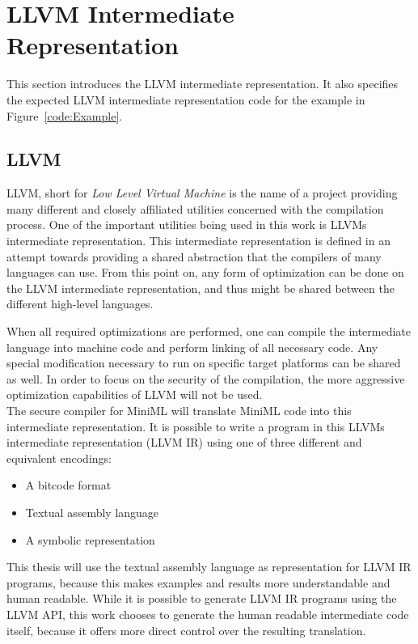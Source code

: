 \documentclass[10pt,a4paper]{report}
\begin{document}

\section{LLVM Intermediate Representation \label{sec:LLVM}}
This section introduces the LLVM intermediate representation. It also specifies the expected LLVM intermediate representation code for the example in Figure~\ref{code:Example}.

\subsection{LLVM}
LLVM, short for \emph{Low Level Virtual Machine} is the name of a project providing many different and closely affiliated utilities concerned with the compilation process. One of the important utilities being used in this work is LLVMs intermediate representation. This intermediate representation is defined in an attempt towards providing a shared abstraction that the compilers of many languages can use. 
From this point on, any form of optimization can be done on the LLVM intermediate representation, and thus might be shared between the different high-level languages.

When all required optimizations are performed, one can compile the intermediate language into machine code and perform linking of all necessary code. Any special modification necessary to run on specific target platforms can be shared as well. In order to focus on the security of the compilation, the more aggressive optimization capabilities of LLVM will not be used.
\\[1em]
The secure compiler for \mbox{MiniML} will translate \mbox{MiniML} code into this intermediate representation.
It is possible to write a program in this LLVMs intermediate representation (LLVM IR) using one of three different and equivalent encodings:
\begin{itemize}
\item A bitcode format
\item Textual assembly language
\item A symbolic representation
\end{itemize}

This thesis will use the textual assembly language as representation for LLVM IR programs, because this makes examples and results more understandable and human readable.
While it is possible to generate LLVM IR programs using the LLVM API, this work chooses to generate the human readable intermediate code itself, because it offers more direct control over the resulting translation.
\end{document}
